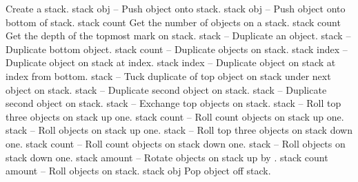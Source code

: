 \begin{longtable}{}
	{Create a stack.}
\hline
\optableent
	{stack obj}
	{{\bf {}}}
	{--}
	{Push object onto stack.}
\hline
\optableent
	{stack obj}
	{{\bf {}}}
	{--}
	{Push object onto bottom of stack.}
\hline
\optableent
	{stack}
	{{\bf {}}}
	{count}
	{Get the number of objects on a stack.}
\hline
\optableent
	{stack}
	{{\bf {}}}
	{count}
	{Get the depth of the topmost mark on stack.}
\hline
\optableent
	{stack}
	{{\bf {}}}
	{--}
	{Duplicate an object.}
\hline
\optableent
	{stack}
	{{\bf {}}}
	{--}
	{Duplicate bottom object.}
\hline
\optableent
	{stack count}
	{{\bf {}}}
	{--}
	{Duplicate objects on stack.}
\hline
\optableent
	{stack index}
	{{\bf {}}}
	{--}
	{Duplicate object on stack at index.}
\hline
\optableent
	{stack index}
	{{\bf {}}}
	{--}
	{Duplicate object on stack at index from bottom.}
\hline
\optableent
	{stack}
	{{\bf {}}}
	{--}
	{Tuck duplicate of top object on stack under next object on stack.}
\hline
\optableent
	{stack}
	{{\bf {}}}
	{--}
	{Duplicate second object on stack.}
\hline
\optableent
	{stack}
	{{\bf {}}}
	{--}
	{Duplicate second object on stack.}
\hline
\optableent
	{stack}
	{{\bf {}}}
	{--}
	{Exchange top objects on stack.}
\hline
\optableent
	{stack}
	{{\bf {}}}
	{--}
	{Roll top three objects on stack up one.}
\hline
\optableent
	{stack count}
	{{\bf {}}}
	{--}
	{Roll count objects on stack up one.}
\hline
\optableent
	{stack}
	{{\bf {}}}
	{--}
	{Roll objects on stack up one.}
\hline
\optableent
	{stack}
	{{\bf {}}}
	{--}
	{Roll top three objects on stack down one.}
\hline
\optableent
	{stack count}
	{{\bf {}}}
	{--}
	{Roll count objects on stack down one.}
\hline
\optableent
	{stack}
	{{\bf {}}}
	{--}
	{Roll objects on stack down one.}
\hline
\optableent
	{stack amount}
	{{\bf {}}}
	{--}
	{Rotate objects on stack up by .}
\hline
\optableent
	{stack count amount}
	{{\bf {}}}
	{--}
	{Roll objects on stack.}
\hline
\optableent
	{stack}
	{{\bf {}}}
	{obj}
	{Pop object off stack.}

\end{longtable}

